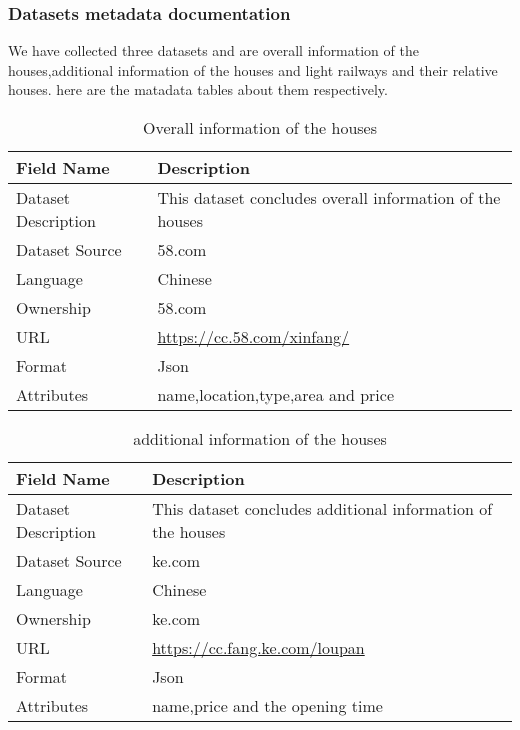 \subsubsection{Datasets metadata documentation}
We have collected three datasets and are overall information of the houses,additional information of the houses and light railways and their relative houses.  here are the matadata tables about them respectively.
    \begin{table}[!htbp]  
    \Large
    \caption{Overall information of the houses}  
    \begin{center}
    \begin{tabular}{|p{4.3cm}|p{13cm}|}%
    \hline  
    Field Name & Description \\  
    \hline  
    Dataset Description & This dataset concludes overall information of the houses \\
    \hline
    Dataset Source & 58.com \\  
    \hline
    Language & Chinese \\
    \hline
    Ownership & 58.com \\
    \hline
    URL & \url{https://cc.58.com/xinfang/} \\
    \hline
    Format & Json \\
    \hline  
    Attributes & name,location,type,area and price \\
    \hline
    \end{tabular}
    \end{center}
    \end{table}  
    
    \begin{table}[!htbp]  
    \Large
    \caption{additional information of the houses}  
    \begin{center}
    \begin{tabular}{|p{4.3cm}|p{13cm}|}%
    \hline  
    Field Name & Description \\  
    \hline  
    Dataset Description & This dataset concludes additional information of the houses \\
    \hline
    Dataset Source & ke.com \\  
    \hline
    Language & Chinese \\
    \hline
    Ownership & ke.com \\
    \hline
    URL & \url{https://cc.fang.ke.com/loupan} \\
    \hline
    Format & Json \\
    \hline 
    Attributes & name,price and the opening time \\
    \hline
    \end{tabular}
    \end{center}
    \end{table}  
    

